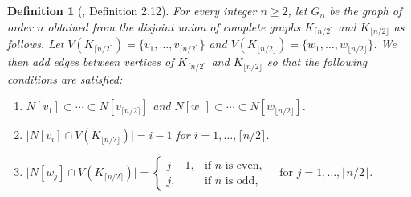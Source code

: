 \documentclass[preprint,12pt]{elsarticle}
\newtheorem{definition}[theorem]{Definition}
\begin{document}
\begin{definition}[\cite{Oboudi2017}, Definition 2.12]\label{def:Gs}
For every integer $n \geq 2$, let $G_n$ be the graph of order $n$ obtained from the 
disjoint union of complete graphs $K_{\lceil n/2\rceil}$ and $K_{\lfloor n/2\rfloor}$ 
as follows. Let 
$V(K_{\lceil n/2\rceil})=\{v_1,\dots,v_{\lceil n/2\rceil}\}$ and 
$V(K_{\lfloor n/2\rfloor})=\{w_1,\dots,w_{\lfloor n/2\rfloor}\}$. 
We then add edges between vertices of $K_{\lceil n/2\rceil}$ and $K_{\lfloor n/2\rfloor}$ 
so that the following conditions are satisfied:

\begin{enumerate}
\item $N[v_1]\subset \cdots \subset N[v_{\lceil n/2\rceil}]$ and 
$N[w_1]\subset \cdots \subset N[w_{\lfloor n/2\rfloor}]$.
\item $\lvert N[v_i]\cap V(K_{\lfloor n/2\rfloor})\rvert = i-1$ for $i=1,\dots,\lceil n/2\rceil$.
\item $\lvert N[w_j]\cap V(K_{\lceil n/2\rceil})\rvert =
\begin{cases}
j-1, & \text{if $n$ is even},\\[4pt]
j, & \text{if $n$ is odd},
\end{cases}
\quad\text{for } j=1,\dots,\lfloor n/2\rfloor.
$
\end{enumerate}
\end{definition}
\end{document}
